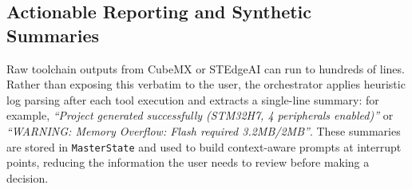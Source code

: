 \subsection{Actionable Reporting and Synthetic Summaries}

Raw toolchain outputs from CubeMX or STEdgeAI can run to hundreds of lines. Rather than exposing this verbatim to the user, the orchestrator applies heuristic log parsing after each tool execution and extracts a single-line summary: for example, \textit{``Project generated successfully (STM32H7, 4 peripherals enabled)''} or \textit{``WARNING: Memory Overflow: Flash required 3.2MB/2MB''}. These summaries are stored in \texttt{MasterState} and used to build context-aware prompts at interrupt points, reducing the information the user needs to review before making a decision.
